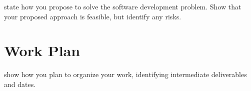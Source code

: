 \documentclass{mprop}
\begin{document}
state how you propose to solve the software development problem. Show that your proposed approach is feasible, but identify any risks.

\section{Work Plan}

show how you plan to organize your work, identifying intermediate deliverables and dates.



\end{document}
